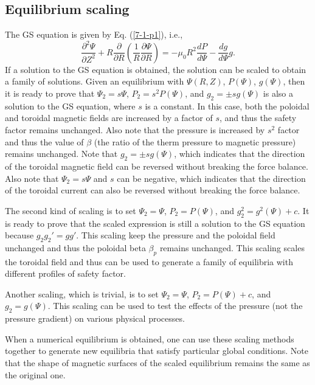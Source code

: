 \documentclass{llncs}
\begin{document}
\subsection{Equilibrium scaling}

The GS equation is given by Eq. (\ref{7-1-p1}), i.e.,
\begin{equation}
  \label{23-1-17-p1} \frac{\partial^2 \Psi}{\partial Z^2} + R
  \frac{\partial}{\partial R} \left( \frac{1}{R} \frac{\partial \Psi}{\partial
  R} \right) = - \mu_0 R^2 \frac{d P}{d \Psi} - \frac{d g}{d \Psi} g.
\end{equation}
If a solution to the GS equation is obtained, the solution can be scaled to
obtain a family of solutions. Given an equilibrium with $\Psi (R, Z)$, $P
(\Psi)$, $g (\Psi)$, then it is ready to prove that $\Psi_2 = s \Psi$, $P_2 =
s^2 P (\Psi)$, and $g_2 = \pm s g (\Psi)$ is also a solution to the GS
equation, where $s$ is a constant. In this case, both the poloidal and
toroidal magnetic fields are increased by a factor of $s$, and thus the safety
factor remains unchanged. Also note that the pressure is increased by $s^2$
factor and thus the value of $\beta$ (the ratio of the therm pressure to
magnetic pressure) remains unchanged. Note that $g_2 = \pm s g (\Psi)$, which
indicates that the direction of the toroidal magnetic field can be reversed
without breaking the force balance. Also note that $\Psi_2 = s \Psi$ and $s$
can be negative, which indicates that the direction of the toroidal current
can also be reversed without breaking the force balance.

The second kind of scaling is to set $\Psi_2 = \Psi$, $P_2 = P (\Psi)$, and
$g^2_2 = g^2 (\Psi) + c$. It is ready to prove that the scaled expression is
still a solution to the GS equation because $g_2 g_2' = g g'$. This scaling
keep the pressure and the poloidal field unchanged and thus the poloidal beta
$\beta_p$ remains unchanged. This scaling scales the toroidal field and thus
can be used to generate a family of equilibria with different profiles of
safety factor.

Another scaling, which is trivial, is to set $\Psi_2 = \Psi$, $P_2 = P (\Psi)
+ c$, and $g_2 = g (\Psi)$. This scaling can be used to test the effects of
the pressure (not the pressure gradient) on various physical processes.

When a numerical equilibrium is obtained, one can use these scaling methods
together to generate new equilibria that satisfy particular global conditions.
Note that the shape of magnetic surfaces of the scaled equilibrium remains the
same as the original one.
\end{document}
